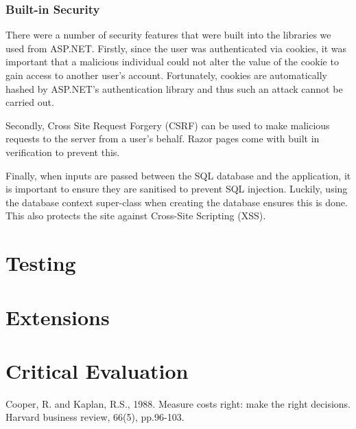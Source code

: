 \documentclass{article}
\begin{document}
        \subsubsection{Built-in Security}
            \par
                There were a number of security features that were built into the libraries we used from ASP.NET.
                Firstly, since the user was authenticated via cookies, it was important that a malicious individual could not alter the value of the cookie to gain access to another user’s account.
                Fortunately, cookies are automatically hashed by ASP.NET’s authentication library and thus such an attack cannot be carried out.

            \par
                Secondly, Cross Site Request Forgery (CSRF) can be used to make malicious requests to the server from a user’s behalf.
                Razor pages come with built in verification to prevent this.

            \par
                Finally, when inputs are passed between the SQL database and the application, it is important to ensure they are sanitised to prevent SQL injection.
                Luckily, using the database context super-class when creating the database ensures this is done.
                This also protects the site against Cross-Site Scripting (XSS).


\section{Testing}

\section{Extensions}

\section{Critical Evaluation}

\begin{thebibliography}{1}
        Cooper, R. and Kaplan, R.S., 1988. Measure costs right: make the right decisions. Harvard business review, 66(5), pp.96-103.
\end{thebibliography}
\end{document}
